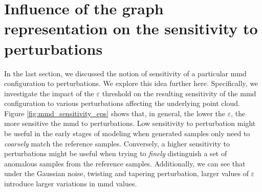
\section{Influence of the graph representation on the sensitivity to perturbations}\label{sec:results_sensitivity}

In the last section, we discussed the notion of sensitivity of a particular \acrshort{mmd}
configuration to perturbations. We explore this idea further here. Specifically,
we investigate the impact of the $\varepsilon$ threshold on the resulting
sensitivity of the \acrshort{mmd} configuration to various perturbations affecting the
underlying point cloud. Figure \ref{fig:mmd_sensitivity_eps} shows that, in
general, the lower the $\varepsilon$, the more sensitive the \acrshort{mmd} to
perturbations. Low sensitivity to perturbation might be useful in the early
stages of modeling when generated samples only need to \emph{coarsely} match
the reference samples. Conversely, a higher sensitivity to perturbations might
be useful when trying to \emph{finely} distinguish a set of anomalous samples
from the reference samples. Additionally, we can see that under the Gaussian
noise, twisting and tapering perturbation, larger values of $\varepsilon$
introduce larger variations in \acrshort{mmd} values.


